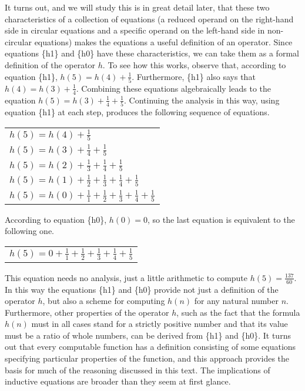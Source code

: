 It turns out, and we will study this is in great detail later,
that these two characteristics of a collection of equations
(a reduced operand on the right-hand side in circular equations
and a specific operand on the left-hand side in non-circular equations)
makes the equations a useful definition of an operator.
Since equations \{h1\} and \{h0\} have these characteristics,
we can take them as a formal definition of the operator $h$.
To see how this works, observe that, according to equation \{h1\},
$h(5) = h(4)+\frac{1}{5}$.
Furthermore, \{h1\} also says that $h(4) = h(3)+\frac{1}{4}$.
Combining these equations algebraically leads to the equation
$h(5) = h(3)+\frac{1}{4}+\frac{1}{5}$.
Continuing the analysis in this way, using equation \{h1\} at each step,
produces the following sequence of equations.
\begin{center}
\begin{tabular}{l}
$h(5) = h(4) + \frac{1}{5}$ \\
$h(5) = h(3) + \frac{1}{4} + \frac{1}{5}$\\
$h(5) = h(2) + \frac{1}{3} + \frac{1}{4} + \frac{1}{5}$\\
$h(5) = h(1) + \frac{1}{2} + \frac{1}{3} + \frac{1}{4} + \frac{1}{5}$\\
$h(5) = h(0) + \frac{1}{1} + \frac{1}{2} + \frac{1}{3} + \frac{1}{4} + \frac{1}{5}$\\
\end{tabular}
\end{center}

According to equation \{h0\}, $h(0) = 0$,
so the last equation is equivalent to the following one.
\begin{center}
\begin{tabular}{l}
$h(5) = 0 + \frac{1}{1} + \frac{1}{2} + \frac{1}{3} + \frac{1}{4} + \frac{1}{5}$\\
\end{tabular}
\end{center}

This equation needs no analysis, just a little arithmetic
to compute $h(5) = \frac{137}{60}$.
In this way the equations \{h1\} and \{h0\} provide not just
a definition of the operator $h$, but also a scheme for computing $h(n)$
for any natural number $n$.
Furthermore, other properties of the operator $h$,
such as the fact that the formula $h(n)$
must in all cases stand for a strictly positive number
and that its value must be a ratio of whole numbers,
can be derived from \{h1\} and \{h0\}.
It turns out that every computable function has a definition consisting
of some equations specifying particular properties of the function,
and this approach provides the basis for much of the reasoning
discussed in this text.
The implications of inductive equations are broader than they seem at first glance.

